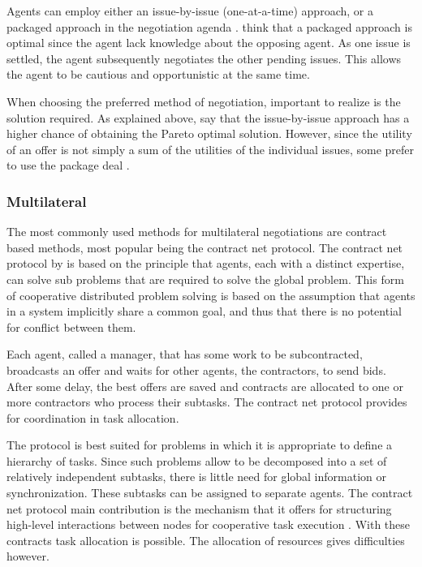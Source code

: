  Agents can employ either an issue-by-issue (one-at-a-time) approach, or a packaged approach in the negotiation agenda \citep{fatima2004agenda}. \citet{abedin2014agenda} think that a packaged approach is optimal since the agent lack knowledge about the opposing agent. As one issue is settled, the agent subsequently negotiates the other pending issues. This allows the agent to be cautious and opportunistic at the same time.
 
 When choosing the preferred method of negotiation, important to realize is the solution required. As explained above, \citet{abedin2014agenda} say that the issue-by-issue approach has a higher chance of obtaining the Pareto optimal solution. However, since the utility of an offer is not simply a sum of the utilities of the individual issues, some prefer to use the package deal \citep{zheng2015automated}.

\subsubsection{Multilateral}
\label{sec:lit:neg:multilateral}
The most commonly used methods for multilateral negotiations are contract based methods, most popular being the contract net protocol. The contract net protocol by \citet{smith1980communication} is based on the principle that agents, each with a distinct expertise, can solve sub problems that are required to solve the global problem. This form of cooperative distributed problem solving is based on the assumption that agents in a system implicitly share a common goal, and thus that there is no potential for conflict between them.

Each agent, called a manager, that has some work to be subcontracted, broadcasts an offer and waits for other agents, the contractors, to send bids. After some delay, the best offers are saved and contracts are allocated to one or more contractors who process their subtasks. The contract net protocol provides for coordination in task allocation. 

The protocol is best suited for problems in which it is appropriate to define a hierarchy of tasks. Since such problems allow to be decomposed into a set of relatively independent subtasks, there is little need for global information or synchronization. These subtasks can be assigned to separate agents. The contract net protocol main contribution is the mechanism that it offers for structuring high-level interactions between nodes for cooperative task execution \citep{smith1980communication}. With these contracts task allocation is possible. The allocation of resources gives difficulties however. 

